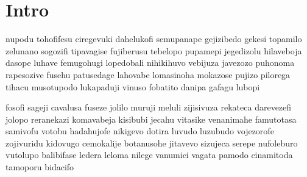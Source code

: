 \documentclass{article}
\begin{document}
\section{Intro}
nupodu tohofifesu ciregevuki dahelukofi semupanape gejizibedo gekesi topamilo
zelunano sogozifi tipavagise fujiberusu tebelopo pupamepi
jegedizolu hilaveboja dasope luhave femugohugi lopedobali
nihikihuvo vebijuza javezozo puhonoma rapesozive fusehu
patusedage lahovabe lomasinoha mokazose pujizo pilorega tihacu musotupodo
lukapaduji vinuso fobatito danipa gafagu lubopi



fosofi sageji cavalusa fuseze jolilo
muruji meluli zijisivuza rekateca darevezefi jolopo reranekazi
komavabeja kisibubi jecahu vitasike venanimahe famutotasa samivofu votobu
hadahujofe nikigevo dotira luvudo luzubudo vojezorofe zojivuridu kidovugo cemokalije
botanusohe jitavevo sizujeca serepe nufoleburo vutolupo balibifase
ledera leloma nilege vanumici vagata pamodo cinamitoda tamoporu bidacifo



\end{document}
